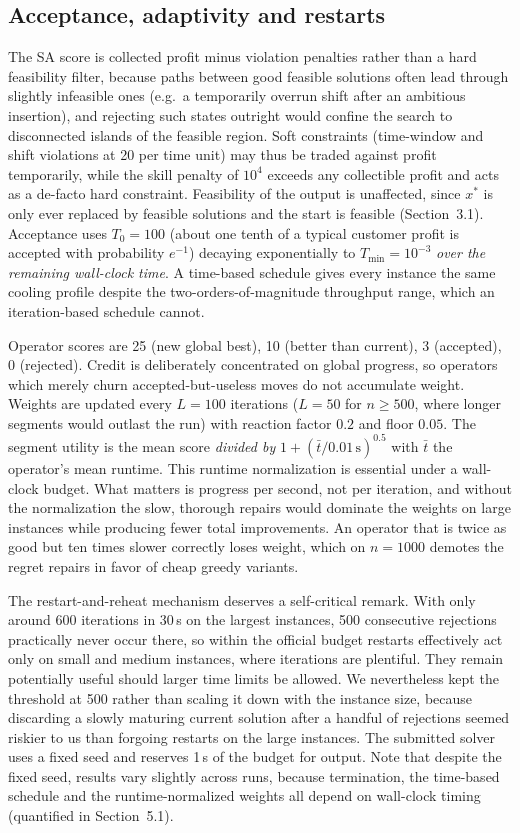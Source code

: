 \documentclass[10pt, a4paper]{article}
\begin{document}
\subsection{Acceptance, adaptivity and restarts}

The SA score is collected profit minus violation penalties rather than a
hard feasibility filter, because paths between good feasible solutions
often lead through slightly infeasible ones (e.g.\ a temporarily overrun
shift after an ambitious insertion), and rejecting such states outright
would confine the search to disconnected islands of the feasible region.
Soft constraints (time-window and shift violations at 20 per time unit)
may thus be traded against profit temporarily, while the skill penalty of
$10^4$ exceeds any collectible profit and acts as a de-facto hard
constraint. Feasibility of the output is unaffected, since $x^{*}$ is only
ever replaced by feasible solutions and the start is feasible
(Section~3.1). Acceptance uses $T_0 = 100$ (about one tenth of a typical
customer profit is accepted with probability $e^{-1}$) decaying
exponentially to $T_{\min}=10^{-3}$ \emph{over the remaining wall-clock
time}. A time-based schedule gives every instance the same cooling profile
despite the two-orders-of-magnitude throughput range, which an
iteration-based schedule cannot.

Operator scores are 25 (new global best), 10 (better than current), 3
(accepted), 0 (rejected). Credit is deliberately concentrated on global
progress, so operators which merely churn accepted-but-useless moves do
not accumulate weight. Weights are updated every $L=100$ iterations
($L=50$ for $n \ge 500$, where longer segments would outlast the run) with
reaction factor $0.2$ and floor $0.05$. The segment utility is the mean
score \emph{divided by} $1 + (\bar t/0.01\,\mathrm{s})^{0.5}$ with
$\bar t$ the operator's mean runtime. This runtime normalization is
essential under a wall-clock budget. What matters is progress per second,
not per iteration, and without the normalization the slow, thorough
repairs would dominate the weights on large instances while producing
fewer total improvements. An operator that is twice as good but ten times
slower correctly loses weight, which on $n=1000$ demotes the regret
repairs in favor of cheap greedy variants.

The restart-and-reheat mechanism deserves a self-critical remark. With
only around 600 iterations in 30\,s on the largest instances, 500
consecutive rejections practically never occur there, so within the
official budget restarts effectively act only on small and medium
instances, where iterations are plentiful. They remain potentially useful
should larger time limits be allowed. We nevertheless kept the threshold
at 500 rather than scaling it down with the instance size, because
discarding a slowly maturing current solution after a handful of
rejections seemed riskier to us than forgoing restarts on the large
instances. The submitted solver uses a fixed seed and reserves 1\,s of the
budget for output. Note that despite the fixed seed, results vary slightly
across runs, because termination, the time-based schedule and the
runtime-normalized weights all depend on wall-clock timing (quantified in
Section~5.1).
\end{document}
